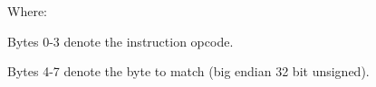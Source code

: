 Where:

Bytes 0-3 denote the instruction opcode.

Bytes 4-7 denote the byte to match
(big endian 32 bit unsigned).
